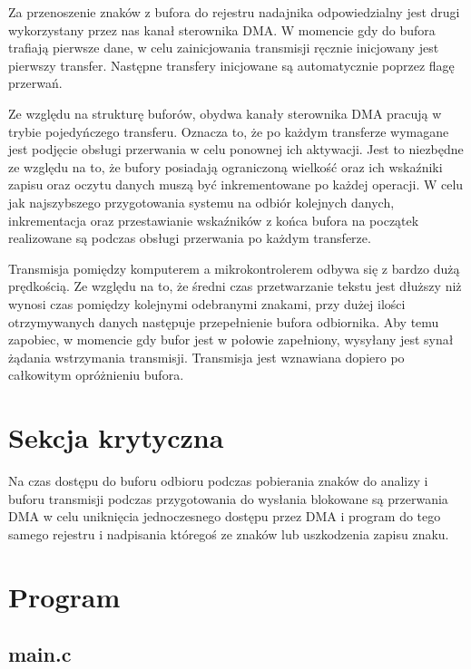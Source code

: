 \documentclass[fleqn]{article}
\begin{document}
Za przenoszenie znaków z bufora do rejestru nadajnika odpowiedzialny jest drugi wykorzystany przez nas kanał sterownika DMA. W momencie gdy do bufora trafiają pierwsze dane, w celu zainicjowania transmisji ręcznie inicjowany jest pierwszy transfer. Następne transfery inicjowane są automatycznie poprzez flagę przerwań.

Ze względu na strukturę buforów, obydwa kanały sterownika DMA pracują w trybie pojedyńczego transferu. Oznacza to, że po każdym transferze wymagane jest podjęcie obsługi przerwania w celu ponownej ich aktywacji. Jest to niezbędne ze względu na to, że bufory posiadają ograniczoną wielkość oraz ich wskaźniki zapisu oraz oczytu danych muszą być inkrementowane po każdej operacji. W celu jak najszybszego przygotowania systemu na odbiór kolejnych danych, inkrementacja oraz przestawianie wskaźników z końca bufora na początek realizowane są podczas obsługi przerwania po każdym transferze.

Transmisja pomiędzy komputerem a mikrokontrolerem odbywa się z bardzo dużą prędkością. Ze względu na to, że średni czas przetwarzanie tekstu jest dłuższy niż wynosi czas pomiędzy kolejnymi odebranymi znakami, przy dużej ilości otrzymywanych danych następuje przepełnienie bufora odbiornika. Aby temu zapobiec, w momencie gdy bufor jest w połowie zapełniony, wysyłany jest synał żądania wstrzymania transmisji. Transmisja jest wznawiana dopiero po całkowitym opróżnieniu bufora.

\section{Sekcja krytyczna}
Na czas dostępu do buforu odbioru podczas pobierania znaków do analizy i buforu transmisji podczas przygotowania do wysłania blokowane są przerwania DMA w celu uniknięcia jednoczesnego dostępu przez DMA i program do tego samego rejestru i nadpisania któregoś ze znaków lub uszkodzenia zapisu znaku.


\pagebreak

\section{Program}
\subsection{main.c}

\begin{minipage}[t]{.45\textwidth}
	
\end{minipage}\hfill
\noindent\begin{minipage}[t]{.45\textwidth}
	
\end{minipage}\hfill
\end{document}
